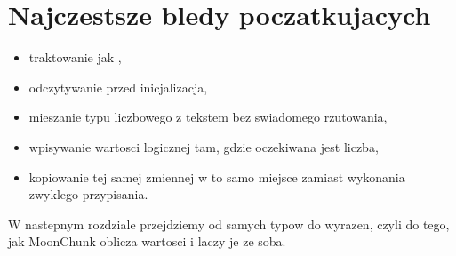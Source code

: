 \section{Najczestsze bledy poczatkujacych}
\begin{itemize}
  \item traktowanie  jak ,
  \item odczytywanie  przed inicjalizacja,
  \item mieszanie typu liczbowego z tekstem bez swiadomego rzutowania,
  \item wpisywanie wartosci logicznej tam, gdzie oczekiwana jest liczba,
  \item kopiowanie tej samej zmiennej w to samo miejsce zamiast wykonania zwyklego przypisania.
\end{itemize}

W nastepnym rozdziale przejdziemy od samych typow do wyrazen, czyli do tego,
jak MoonChunk oblicza wartosci i laczy je ze soba.
